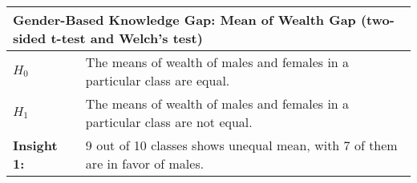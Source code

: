 

\begin{table}[h!]
    \centering
    \renewcommand{\arraystretch}{1.3}
    \begin{tabular}{|l p{12cm}|} 
        \hline
        \multicolumn{2}{|l|}{\textbf{Gender-Based Knowledge Gap: Mean of Wealth Gap (two-sided t-test and Welch's test)}} \\
        \hline
        \textbf{$H_0$} & The means of wealth of males and females in a particular class are equal. \\
        \textbf{$H_1$} & The means of wealth of males and females in a particular class are not equal. \\
        \hline
        \textbf{Insight 1:} & 9 out of 10 classes shows unequal mean, with 7 of them are in favor of males. \\
        \hline
    \end{tabular}
\end{table}



